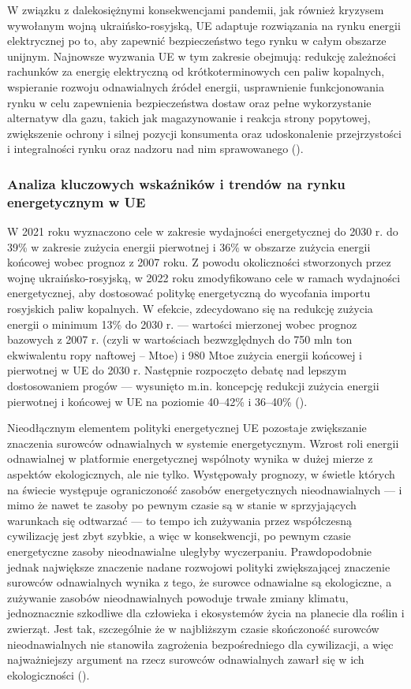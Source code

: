 \documentclass[polish, twoside, 12pt, a4paper]{article}
\theoremstyle{definition}
\theoremstyle{plain}
\theoremstyle{remark}
\begin{document}
W związku z dalekosiężnymi konsekwencjami pandemii, jak również kryzysem wywołanym wojną ukraińsko-rosyjską, UE adaptuje rozwiązania na rynku energii elektrycznej po to, aby zapewnić bezpieczeństwo tego rynku w całym obszarze unijnym. Najnowsze wyzwania UE w tym zakresie obejmują: redukcję zależności rachunków za energię elektryczną od krótkoterminowych cen paliw kopalnych, wspieranie rozwoju odnawialnych źródeł energii, usprawnienie funkcjonowania rynku w celu zapewnienia bezpieczeństwa dostaw oraz pełne wykorzystanie alternatyw dla gazu, takich jak magazynowanie i reakcja strony popytowej, zwiększenie ochrony i silnej pozycji konsumenta oraz udoskonalenie przejrzystości i integralności rynku oraz nadzoru nad nim sprawowanego (\cite{ec2023}). 


\subsubsection{Analiza kluczowych wskaźników i trendów na rynku energetycznym w UE}

W 2021 roku wyznaczono cele w zakresie wydajności energetycznej do 2030 r. do 39\% w zakresie zużycia energii pierwotnej i 36\% w obszarze zużycia energii końcowej wobec prognoz z 2007 roku. Z powodu okoliczności stworzonych przez wojnę ukraińsko-rosyjską, w 2022 roku zmodyfikowano cele w ramach wydajności energetycznej, aby dostosować politykę energetyczną do wycofania importu rosyjskich paliw kopalnych. W efekcie, zdecydowano się na redukcję zużycia energii o minimum 13\% do 2030 r. --- wartości mierzonej wobec prognoz bazowych z 2007 r. (czyli w wartościach bezwzględnych do 750 mln ton ekwiwalentu ropy naftowej – Mtoe) i 980 Mtoe zużycia energii końcowej i pierwotnej w UE do 2030 r. Następnie rozpoczęto debatę nad lepszym dostosowaniem progów --- wysunięto m.in. koncepcję redukcji zużycia energii pierwotnej i końcowej w UE na poziomie 40–42\% i 36–40\% (\cite{ep2023}).

Nieodłącznym elementem polityki energetycznej UE pozostaje zwiększanie znaczenia surowców odnawialnych w systemie energetycznym. Wzrost roli energii odnawialnej w platformie energetycznej wspólnoty wynika w dużej mierze z aspektów ekologicznych, ale nie tylko. Występowały prognozy, w świetle których na świecie występuje ograniczoność zasobów energetycznych nieodnawialnych --- i mimo że nawet te zasoby po pewnym czasie są w stanie w sprzyjających warunkach się odtwarzać --- to tempo ich zużywania przez współczesną cywilizację jest zbyt szybkie, a więc w konsekwencji, po pewnym czasie energetyczne zasoby nieodnawialne uległyby wyczerpaniu. Prawdopodobnie jednak największe znaczenie nadane rozwojowi polityki zwiększającej znaczenie surowców odnawialnych wynika z tego, że surowce odnawialne są ekologiczne, a zużywanie zasobów nieodnawialnych powoduje trwałe zmiany klimatu, jednoznacznie szkodliwe dla człowieka i ekosystemów życia na planecie dla roślin i zwierząt. Jest tak, szczególnie że w najbliższym czasie skończoność surowców nieodnawialnych nie stanowiła zagrożenia bezpośredniego dla cywilizacji, a więc najważniejszy argument na rzecz surowców odnawialnych zawarł się w ich ekologiczności (\cite{ep2023}). 
\end{document}
